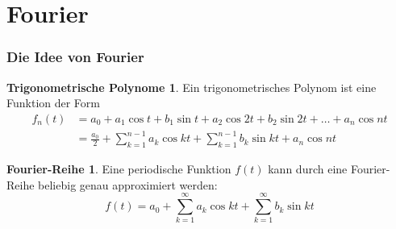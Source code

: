 %
%
%
\theoremstyle{definition}
\newtheorem{trigopol}{Trigonometrische Polynome}
\newtheorem{fourier}{Fourier-Reihe}
\newtheorem{leastsquares}{Kleinste Quadrate}
\newtheorem{loesung}{Lösung}
\newtheorem{geometrie}{Schwerpunkt}
\newtheorem{produkte}{Produkte}
\newtheorem{basis}{Basiseigenschaft}
\newtheorem{frage}{Frage}
\newtheorem{antwort}{Antwort}
\newtheorem{dft}{Diskrete Fourier-Transformation}



\setlength{\abovedisplayskip}{3pt}
\setlength{\belowdisplayskip}{3pt}


\section{Fourier}

%
%
\begin{frame}
\frametitle{Die Idee von Fourier}
\begin{trigopol}
Ein trigonometrisches Polynom ist eine Funktion der Form
\begin{align*}
f_n(t)
&=
a_0 + a_1\cos t+b_1\sin t + a_2\cos 2t + b_2\sin 2t + \dots + a_n\cos nt
\\
&=
\frac{a_0}2 + \sum_{k=1}^{n-1} a_k \cos kt + \sum_{k=1}^{n-1}b_k\sin kt
+ a_n\cos nt
\end{align*}
\end{trigopol}
\begin{fourier}
Eine periodische Funktion $f(t)$ kann durch eine Fourier-Reihe beliebig
genau approximiert werden:
\[
f(t)
=
a_0 + \sum_{k=1}^{\infty}  a_k \cos kt + \sum_{k=1}^{\infty}b_k\sin kt
\]
\end{fourier}
\end{frame}

